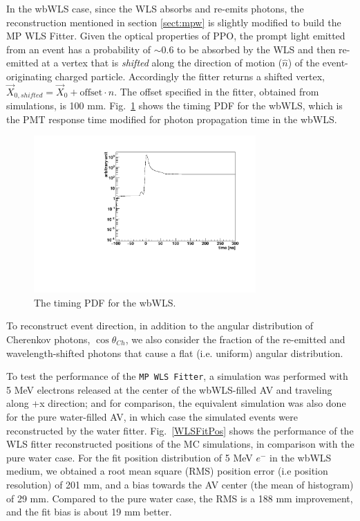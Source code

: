 In the wbWLS case, since the WLS absorbs and re-emits photons, the reconstruction mentioned in section \ref{sect:mpw} is slightly modified to build the MP WLS Fitter. Given the optical properties of PPO, the prompt light emitted from an event has a probability of $\sim$0.6 to be absorbed by the WLS and then re-emitted at a vertex that is {\em shifted} along the direction of motion ($\hat{n}$) of the event-originating charged particle. Accordingly the fitter returns a shifted vertex, $\vec{X}_{0,shifted}=\vec{X}_0+\mathrm{offset}\cdot\hat{n}$. The offset specified in the fitter, obtained from simulations, is 100 mm. Fig.~\ref{WLS_pdf} shows the timing PDF for the wbWLS, which is the PMT response time modified for photon propagation time in the wbWLS.

\begin{figure}[htbp]	
	\centering		
	\begin{minipage}[b]{0.5\textwidth}			
		\includegraphics[height=6cm]{WLSTime_pdf.pdf}			
	\end{minipage}%
	\caption{\label{WLS_pdf} The timing PDF for the wbWLS.}	
\end{figure}

To reconstruct event direction, in addition to the angular distribution of Cherenkov photons, $\cos\theta_{Ch}$, we also consider the fraction of the re-emitted and wavelength-shifted photons that cause a flat (i.e. uniform) angular distribution.

To test the performance of the \texttt{MP WLS Fitter}, a simulation was performed with 5 MeV electrons released at the center of the wbWLS-filled AV and traveling along +x direction; and for comparison, the equivalent simulation was also done for the pure water-filled AV, in which case the simulated events were reconstructed by the water fitter. Fig.~\ref{WLSFitPos} shows the performance of the WLS fitter reconstructed positions of the MC simulations, in comparison with the pure water case. For the fit position distribution of 5 MeV $e^-$ in the wbWLS medium, we obtained a root mean square (RMS) position error (i.e position resolution) of 201 mm, and a bias towards the AV center (the mean of histogram) of 29 mm. Compared to the pure water case, the RMS is a 188 mm improvement, and the fit bias is about 19 mm better.

